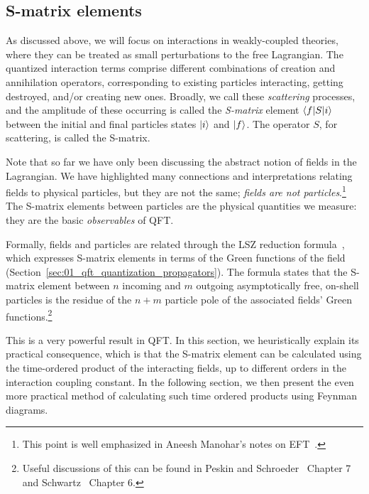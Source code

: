 \subsection{S-matrix elements}
\label{sec:01_qft_interactions_smatrix}

As discussed above, we will focus on interactions in weakly-coupled theories, where they can be treated as small perturbations to the free Lagrangian.
The quantized interaction terms comprise different combinations of creation and annihilation operators, corresponding to existing particles interacting, getting destroyed, and/or creating new ones.
Broadly, we call these \textit{scattering} processes, and the amplitude of these occurring is called the \textit{S-matrix} element $\braket{f|S|i}$ between the initial and final particles states $\ket{i}$ and $\ket{f}$.
The operator $S$, for scattering, is called the S-matrix.

Note that so far we have only been discussing the abstract notion of fields in the Lagrangian.
We have highlighted many connections and interpretations relating fields to physical particles, but they are not the same; \textit{fields are not particles}.\footnote{This point is well emphasized in Aneesh Manohar's notes on EFT~\cite{Manohar:2018aog}.}
The S-matrix elements between particles are the physical quantities we measure: they are the basic \textit{observables} of QFT.

Formally, fields and particles are related through the LSZ reduction formula~\cite{Lehmann:1954rq}, which expresses S-matrix elements in terms of the Green functions of the field (Section~\ref{sec:01_qft_quantization_propagators}).
The formula states that the S-matrix element between $n$ incoming and $m$ outgoing asymptotically free, on-shell particles is the residue of the $n+m$ particle pole of the associated fields' Green functions.\footnote{Useful discussions of this can be found in Peskin and Schroeder~\cite{Peskin:1995ev} Chapter 7 and Schwartz~\cite{Schwartz:2014sze} Chapter 6.}

This is a very powerful result in QFT.
In this section, we heuristically explain its practical consequence, which is that the S-matrix element can be calculated using the time-ordered product of the interacting fields, up to different orders in the interaction coupling constant.
In the following section, we then present the even more practical method of calculating such time ordered products using Feynman diagrams.

